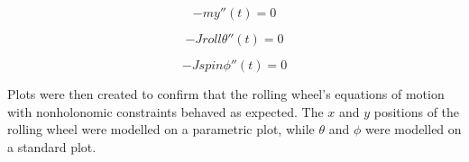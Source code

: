 \begin{equation}
\label{eq:Yroll}
-my''(t)=0
\end{equation}

\begin{equation}
\label{eq:thetaroll}
-Jroll\theta''(t)=0
\end{equation}

\begin{equation}
\label{eq:phiroll}
-Jspin\phi''(t)=0
\end{equation}

Plots were then created to confirm that the rolling wheel's equations of motion with nonholonomic constraints behaved as expected.
The $x$ and $y$ positions of the rolling wheel were modelled on a parametric plot, while $\theta$ and $\phi$ were modelled on a standard plot.

